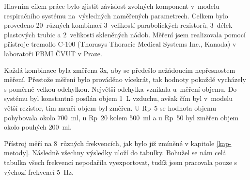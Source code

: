 Hlavním cílem práce bylo zjistit závislost zvolných komponent v~modelu respiračního systému na~výsledných naměřených parametrech.  Celkem bylo provedeno 20~různých kombinací 3~velikostí parabolických rezistorů, 3~délek plastových trubic a 2~velikosti skleněných nádob. Měření jsem realizovala pomocí přístroje tremoflo C-100 (Thorasys Thoracic Medical Systems Inc., Kanada) v laboratoři FBMI ČVUT v Praze. 

Každá kombinace byla změřena 3x, aby se předešlo nežádoucím nepřesnostem měření. Přestože měření bylo prováděno vícekrát, tak hodnoty pokaždé vycházely s poměrně velkou odchylkou. Největší odchylka vznikala u~měření objemu. Do systému byl konstantně posílán objem 1~L vzduchu, avšak čím byl v~modelu větší rezistor,  tím meněí objem byl změřen. U Rp~5 se hodnota objemu pohybovala okolo 700~ml, u Rp~20 kolem 500~ml a u Rp~50 byl změřen objem okolo pouhých 200~ml.

Přístroj měří na 8~různých frekvencích, jak bylo již zmíněné v kapitole \ref{kap-metody}. Následně všechny výsledky uloží do tabulky. Bohužel se nám celá tabulka všech frekvencí nepodařila vyexportovat, tudíž jsem pracovala pouze s výchozí frekvencí 5~Hz. 
